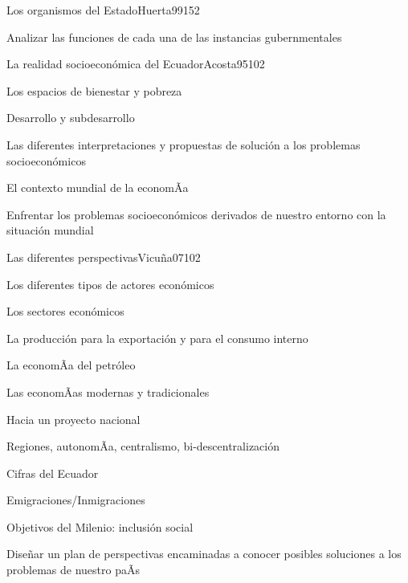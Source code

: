 \begin{syllabus}
\begin{unit}{Los organismos del Estado}{Huerta99}{15}{2}
   \begin{unitgoals}
      \item Analizar las funciones de cada una de las instancias gubernmentales
   \end{unitgoals}
\end{unit}

\begin{unit}{La realidad socioeconómica del Ecuador}{Acosta95}{10}{2}
   \begin{topics}
      \item Los espacios de bienestar y pobreza
	\item Desarrollo y subdesarrollo
	\item Las diferentes interpretaciones y propuestas de solución a los problemas socioeconómicos
	\item El contexto mundial de la economÃ­a
   \end{topics}

   \begin{unitgoals}
      \item Enfrentar los problemas socioeconómicos derivados de nuestro entorno con la situación mundial
   \end{unitgoals}
\end{unit}

\begin{unit}{Las diferentes perspectivas}{Vicuña07}{10}{2}
   \begin{topics}
      \item Los diferentes tipos de actores económicos
	\item Los sectores económicos
	\item La producción para la exportación y para el consumo interno
	\item La economÃ­a del petróleo
	\item Las economÃ­as modernas y tradicionales
	\item Hacia un proyecto nacional
	\item Regiones, autonomÃ­a, centralismo, bi-descentralización
	\item Cifras del Ecuador
	\item Emigraciones/Inmigraciones
	\item Objetivos del Milenio: inclusión social 
   \end{topics}

   \begin{unitgoals}
      \item Diseñar un plan de perspectivas encaminadas a conocer posibles soluciones a los problemas de nuestro paÃ­s
   \end{unitgoals}
\end{unit}

\begin{coursebibliography}
\end{coursebibliography}
\end{syllabus}
